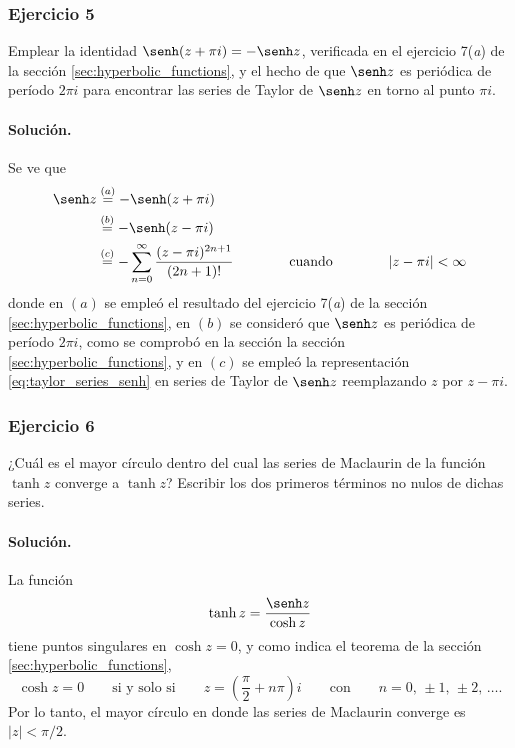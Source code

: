 \documentclass[a4paper]{report}
\begin{document}
\subsubsection*{Ejercicio 5}

Emplear la identidad \(\senh(z+\pi i)=-\senh z\), verificada en el ejercicio 7(\textit{a}) de la sección \ref{sec:hyperbolic_functions}, y el hecho de que \(\senh z\) es periódica de período \(2\pi i\) para encontrar las series de Taylor de \(\senh z\) en torno al punto \(\pi i\).

\paragraph{Solución.} Se ve que 
\begin{align*}
 \senh z&\overset{(a)}{=}-\senh(z+\pi i)\\
  &\overset{(b)}{=}-\senh(z-\pi i)\\
  &\overset{(c)}{=}-\sum_{n=0}^\infty\frac{(z-\pi i)^{2n+1}}{(2n+1)!}
 \qquad\qquad\textrm{cuando}\qquad\qquad
 |z-\pi i|<\infty
\end{align*}
donde en \((a)\) se empleó el resultado del ejercicio 7(\textit{a}) de la sección \ref{sec:hyperbolic_functions}, en \((b)\) se consideró que \(\senh z\) es periódica de período \(2\pi i\), como se comprobó en la sección la sección \ref{sec:hyperbolic_functions}, y en \((c)\) se empleó la representación 
\ref{eq:taylor_series_senh} en series de Taylor de \(\senh z\) reemplazando \(z\) por \(z-\pi i\).

\subsubsection*{Ejercicio 6}

¿Cuál es el mayor círculo dentro del cual las series de Maclaurin de la función \(\tanh z\) converge a \(\tanh z\)? Escribir los dos primeros términos no nulos de dichas series.

\paragraph{Solución.} La función 
\[
 \tanh z=\frac{\senh z}{\cosh z}
\]
tiene puntos singulares en \(\cosh z=0\), y como indica el teorema de la sección \ref{sec:hyperbolic_functions},
\[
 \cosh z=0
 \qquad\textrm{si y solo si}\qquad
 z=\left(\frac{\pi}{2}+n\pi\right)i
 \qquad\textrm{con}\qquad 
 n=0,\,\pm1,\,\pm2,\,\dots.
\]
Por lo tanto, el mayor círculo en donde las series de Maclaurin converge es \(|z|<\pi/2\).
\end{document}
